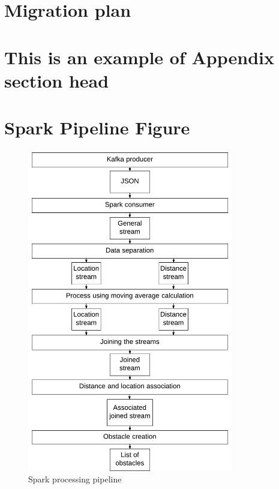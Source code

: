\documentclass[prodmode,acmtosem]{acmsmall} %
\begin{document}




\elecappendix

\medskip

\section{Migration plan}
\label{app:MigrationPlan}
\section{This is an example of Appendix section head}

\pagebreak
\section{Spark Pipeline Figure}
\label{app:SparkPipeline}
\begin{figure}[!ht]
\label{fig:SparkPipeline}
\centering
\includegraphics[width=0.8\textwidth]{SparkPipeline.pdf}
\caption{Spark processing pipeline}
\end{figure}
\clearpage
\pagebreak
\end{document}
